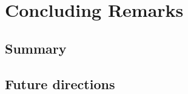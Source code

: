 

\chapter{Concluding Remarks}
\thispagestyle{empty}
\section{Summary}


\section{Future directions}
